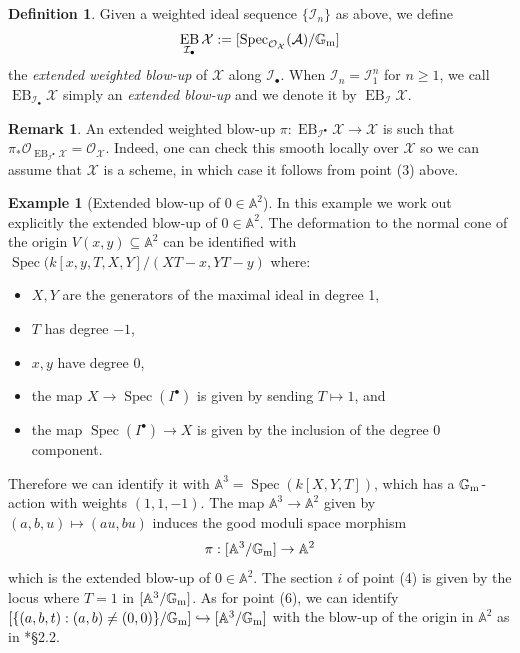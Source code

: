 \documentclass{amsart}
\newcommand{\bA}{\mathbb{A}}
\newcommand{\bG}{\mathbb{G}}
\newcommand{\cA}{\mathcal{A}}
\newcommand{\cI}{\mathcal{I}}
\newcommand{\cO}{\mathcal{O}}
\newcommand{\cX}{\mathcal{X}}
\newcommand{\spec}{\operatorname{Spec}}
\newcommand{\Gm}{\bG_{{\rm m}}}
\DeclareMathOperator{\EB}{EB}
\theoremstyle{definition}
\newtheorem{Def}[theorem]{Definition}
\newtheorem{Remark}[theorem]{Remark}
\theoremstyle{definition}
\newtheorem{example}[theorem]{Example}
\begin{document}
{\begin{enumerate}
\end{enumerate}
\begin{Def}\label{def_ext_w_blowup} Given a weighted ideal sequence $\{\cI_n\}$ as above, we define \[
\EB_{\cI_\bullet}\cX:=[\spec_{\cO_\cX}(\cA)/\Gm]
\]
     the \textit{extended weighted blow-up} of $\cX$ along $\cI_\bullet$. When $\cI_n = \cI_1^n$ for $n\ge 1$, we call $\EB_{\cI_\bullet}\cX$ simply an \textit{extended blow-up} and we denote it by $\EB_{\cI}\cX$.
\end{Def}
\begin{Remark}
    An extended weighted blow-up $\pi:\EB_{\cI^\bullet}\cX\to \cX$ is such that $\pi_*\cO_{\EB_{\cI^\bullet}\cX}=\cO_{\cX}$. Indeed, one can check this smooth locally over $\cX$ so we can assume that $\cX$ is a scheme, in which case it follows from point (3) above.
\end{Remark}

\begin{example}[Extended blow-up of $0\in \bA^2$]\label{example_ext_blowup_of_origin_in_A2} In this example we work out explicitly the extended blow-up of $0\in \bA^2$.
    The deformation to the normal cone of the origin $V(x,y)\subseteq \bA^2$ can be identified with $\spec(k[x,y,T,X,Y]/(XT-x, YT-y)$ where:
    \begin{itemize}
        \item $X,Y$ are the generators of the maximal ideal in degree 1,
        \item $T$ has degree $-1$,
        \item $x,y$ have degree 0,
        \item the map $X\to \spec(I^\bullet)$ is given by sending $T\mapsto 1$, and 
        \item the map $\spec(I^\bullet)\to X$ is given by the inclusion of the degree 0 component.
    \end{itemize}
    Therefore we can identify it with $\bA^3=\spec(k[X,Y,T])$, which has a $\Gm$-action with weights $(1,1,-1)$.
    The map $\bA^3\to \bA^2$ given by $(a,b,u)\mapsto (au,bu)$
    induces the good moduli space morphism \[\pi:[\bA^3/\Gm]\to \bA^2\] which is the extended blow-up of $0\in \bA^2$. The section $i$ of point (4) is given by the locus where $T=1$ in $[\bA^3/\Gm]$. As for point (6), we can identify $[\{(a,b,t):(a,b)\neq (0,0)\}/\Gm]\hookrightarrow[\bA^3/\Gm]$ with the blow-up of the origin in $\bA^2$ as in \cite{Inc}*{\S 2.2}.
    

\end{example}}
\end{document}

